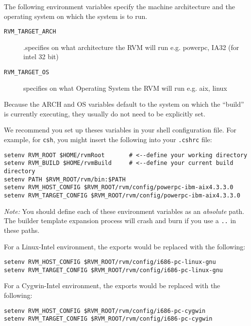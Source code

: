 \begin{enumerate}
The following environment variables specify the machine architecture and
the operating system on which the system is to run.
\begin{description}

\item [{\tt RVM\_TARGET\_ARCH}].specifies on what architecture
the RVM will run e.g.  powerpc, IA32 (for intel 32 bit)

\item [{\tt RVM\_TARGET\_OS}] specifies on what Operating System
the RVM will run e.g. aix, linux

\end{description}

Because the ARCH and OS  variables default to the system on which 
the ``build'' is currently executing, they usually do not need to be 
explicitly set.


We recommend you set up theses variables in your shell configuration
file.  For example, for {\tt csh}, you might insert the
following into your {\tt .cshrc} file:

\begin{verbatim}
setenv RVM_ROOT $HOME/rvmRoot       # <--define your working directory 
setenv RVM_BUILD $HOME/rvmBuild     # <--define your current build directory 
setenv PATH $RVM_ROOT/rvm/bin:$PATH
setenv RVM_HOST_CONFIG $RVM_ROOT/rvm/config/powerpc-ibm-aix4.3.3.0
setenv RVM_TARGET_CONFIG $RVM_ROOT/rvm/config/powerpc-ibm-aix4.3.3.0
\end{verbatim}

{\em Note:} You should define each of these environment variables as an
{\em absolute} path.  The builder template expansion process will crash
and burn if you use a {\tt ..} in these paths.

For a Linux-Intel environment, the exports
would be replaced with the following:

\begin{verbatim}
setenv RVM_HOST_CONFIG $RVM_ROOT/rvm/config/i686-pc-linux-gnu
setenv RVM_TARGET_CONFIG $RVM_ROOT/rvm/config/i686-pc-linux-gnu
\end{verbatim}

For a Cygwin-Intel environment, the  exports
would be replaced with the following:

\begin{verbatim}
setenv RVM_HOST_CONFIG $RVM_ROOT/rvm/config/i686-pc-cygwin
setenv RVM_TARGET_CONFIG $RVM_ROOT/rvm/config/i686-pc-cygwin
\end{verbatim}


\end{enumerate}
